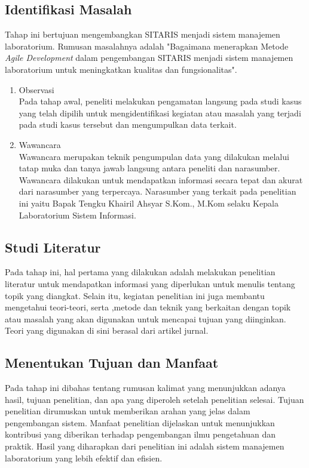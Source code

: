 \subsection{Identifikasi Masalah}
Tahap ini bertujuan mengembangkan SITARIS menjadi sistem manajemen laboratorium. Rumusan masalahnya adalah "Bagaimana menerapkan Metode \textit{Agile Development} dalam pengembangan SITARIS menjadi sistem manajemen laboratorium untuk meningkatkan kualitas dan fungsionalitas".

\begin{enumerate}
	\item Observasi \\
	      Pada tahap awal, peneliti melakukan pengamatan langsung pada studi kasus yang telah dipilih untuk mengidentifikasi kegiatan atau masalah yang terjadi pada studi kasus tersebut dan mengumpulkan data terkait.

	\item Wawancara \\
	      Wawancara merupakan teknik pengumpulan data yang dilakukan melalui tatap muka dan tanya jawab langsung antara peneliti dan narasumber. Wawancara dilakukan untuk mendapatkan informasi secara tepat dan akurat dari narasumber yang terpercaya. Narasumber yang terkait pada penelitian ini yaitu Bapak Tengku Khairil Ahsyar S.Kom., M.Kom selaku Kepala Laboratorium Sistem Informasi.
\end{enumerate}

\subsection{Studi Literatur}
Pada tahap ini, hal pertama yang dilakukan adalah melakukan penelitian literatur untuk mendapatkan informasi yang diperlukan untuk menulis tentang topik yang diangkat. Selain itu, kegiatan penelitian ini juga membantu mengetahui teori-teori, serta ,metode dan teknik yang berkaitan dengan topik atau masalah yang akan digunakan untuk mencapai tujuan yang diinginkan. Teori yang digunakan di sini berasal dari artikel jurnal.

\subsection{Menentukan Tujuan dan Manfaat}
Pada tahap ini dibahas tentang rumusan kalimat yang menunjukkan adanya hasil, tujuan penelitian, dan apa yang diperoleh setelah penelitian selesai. Tujuan penelitian dirumuskan untuk memberikan arahan yang jelas dalam pengembangan sistem. Manfaat penelitian dijelaskan untuk menunjukkan kontribusi yang diberikan terhadap pengembangan ilmu pengetahuan dan praktik. Hasil yang diharapkan dari penelitian ini adalah sistem manajemen laboratorium yang lebih efektif dan efisien.

